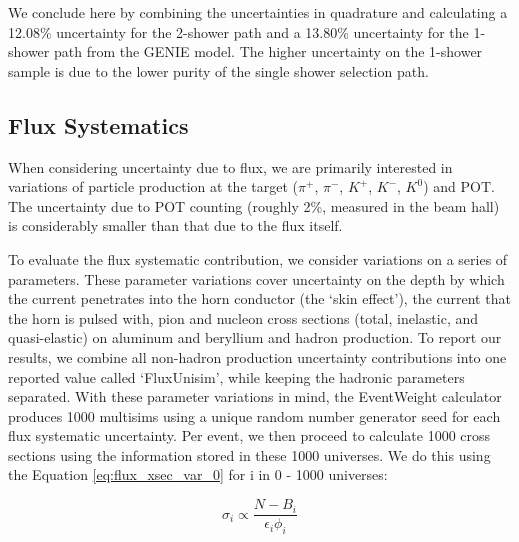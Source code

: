\documentclass{article}
\begin{document}
We conclude here by combining the uncertainties in quadrature and calculating a 12.08\% uncertainty for the 2-shower path and a 13.80\% uncertainty for the 1-shower path from the GENIE model.  The higher uncertainty on the 1-shower sample is due to the lower purity of the single shower selection path.

\clearpage
\subsection{Flux Systematics}
When considering uncertainty due to flux, we are primarily interested in variations of particle production at the target ($\pi^+$, $\pi^-$, $K^+$, $K^-$, $K^0$) and POT.  The uncertainty due to POT counting (roughly 2\%, measured in the beam hall) is considerably smaller than that due to the flux itself. 
\par To evaluate the flux systematic contribution, we consider variations on a series of parameters.  These parameter variations cover uncertainty on the depth by which the current penetrates into the horn conductor (the ‘skin effect’), the current that the horn is pulsed with, pion and nucleon cross sections
(total, inelastic, and quasi-elastic) on aluminum and beryllium and hadron production. To report our results, we combine all non-hadron production uncertainty contributions into one reported value called `FluxUnisim', while keeping the hadronic parameters separated. With these parameter variations in mind, the EventWeight calculator produces 1000 multisims using a unique random number generator seed for each flux systematic uncertainty. Per event, we then proceed to calculate 1000 cross sections using the information stored in these 1000 universes.  We do this using the Equation \ref{eq:flux_xsec_var_0} for i in 0 - 1000 universes:


\begin{equation} \label{eq:flux_xsec_var_0}
  \sigma_i \propto \frac{N - B_i}{\epsilon_i \phi_i} 
\end{equation}
\end{document}

